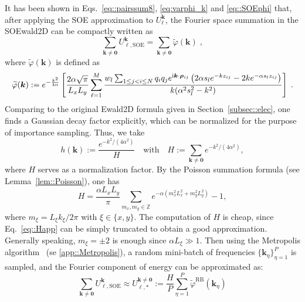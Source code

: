 It has been shown in Eqs.~\eqref{eq::pairssum8}, \eqref{eq:varphi_k} and \eqref{eq::SOEphi} that, after applying the SOE approximation to $U_{\ell}^{\bm{k}}$, the Fourier space summation in the SOEwald2D can be compactly written as
\begin{equation}
	\sum_{\bm{k}\neq\bm{0}} U_{\ell,\text{SOE}}^{\bm{k}} = \sum_{\bm{k}\neq\bm{0}} \widetilde{\varphi} (\bm{k})\;,
\end{equation}
where $\widetilde{\varphi} ({\bm{k}})$ is defined as
\begin{equation}
	\widetilde{\varphi} ({\bm{k}}) := e^{-\frac{k^2}{4 \alpha}} \left[ \frac{2\alpha\sqrt{\pi}}{L_xL_y}\sum_{\ell = 1}^{M}  \frac{w_l \sum_{1\leq j < i \leq N}q_{i} q_{j} e^{\mathrm{i}\boldsymbol{k} \cdot \boldsymbol{\rho}_{ij}} \left(2\alpha s_l e^{-k z_{ij}}-2k e^{-\alpha s_l z_{ij}}\right) }{k(\alpha^2 s_l^2 - k^2)} \right] \;.
\end{equation}
Comparing to the original Ewald2D formula given in Section~\ref{subsec::elec}, one finds a Gaussian decay factor explicitly, which can be normalized for the purpose of importance sampling.
Thus, we take
\begin{equation}\label{eq::hk}
	h(\bm{k}) := \frac{e^{-k^2/(4\alpha^2)}}{H}\quad\text{with}\quad H := \sum_{\bm{k}\neq\bm{0}}e^{-k^2/(4\alpha^2)},
\end{equation}
where $H$ serves as a normalization factor. 
By the Poisson summation formula (see Lemma~\ref{lem::Poisson}), one has 
\begin{equation}\label{eq::Happ}
	H=\frac{\alpha L_xL_y}{\pi}\sum_{m_x,m_y\in\mathbb{Z}}e^{-\alpha(m_x^2L_x^2+m_y^2L_y^2)}-1,
\end{equation}
where $m_{\xi}=L_{\xi}k_{\xi}/2\pi$ with $\xi\in\{x,y\}$. 
The computation of $H$ is cheap, since Eq.~\eqref{eq::Happ} can be simply truncated to obtain a good approximation. 
Generally speaking, $m_{\xi}=\pm 2$ is enough since $\alpha L_{\xi}\gg 1$.
Then using the Metropolis algorithm~\cite{metropolis1953equation, hastings1970monte} (se \ref{app::Metropolis}), a random mini-batch of frequencies $\{\bm{k}_{\eta}\}_{\eta=1}^P$ is sampled, and the Fourier component of energy can be approximated as:
\begin{equation}\label{eq::RBapp}
	\sum_{\bm{k}\neq\bm{0}} U_{\ell,\text{SOE}}^{\bm{k}} \approx U_{\ell,*}^{\bm{k}\neq\bm{0}} := \frac{H}{P}\sum_{\eta=1}^{P}\widetilde{\varphi}^{\text{RB}}(\bm{k}_{\eta})
\end{equation}
